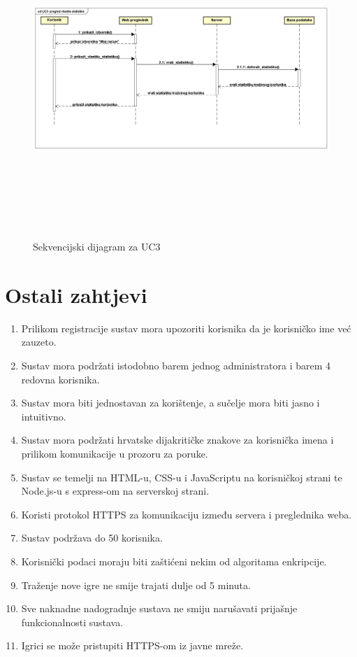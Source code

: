 				\begin{figure}[h]
					\centering
					\includegraphics[width=17cm,height=12cm]{sequenceDiagram2}
					\caption{Sekvencijski dijagram za UC3}
					\label{fig:uc3}
				\end{figure}
				

				\newpage
		\section{Ostali zahtjevi}

			 \begin{enumerate}
			 	\item Prilikom registracije sustav mora upozoriti korisnika da je korisničko ime već zauzeto.
			 	\item Sustav mora podržati istodobno barem jednog administratora i barem 4 redovna korisnika.
			 	\item Sustav mora biti jednostavan za korištenje, a sučelje mora biti jasno i intuitivno.
			 	\item Sustav mora podržati hrvatske dijakritičke znakove za korisnička imena i prilikom komunikacije u prozoru za poruke.
			 	\item Sustav se temelji na HTML-u, CSS-u i JavaScriptu na korisničkoj strani te Node.js-u s express-om na serverskoj strani. 
			 	\item Koristi protokol HTTPS za komunikaciju između servera i preglednika weba.
			 	\item Sustav podržava do 50 korisnika.
			 	\item Korisnički podaci moraju biti zaštićeni nekim od algoritama enkripcije.
			 	\item Traženje nove igre ne smije trajati dulje od 5 minuta.
			 	\item Sve naknadne nadogradnje sustava ne smiju narušavati prijašnje funkcionalnosti sustava.
			 	\item Igrici se može pristupiti HTTPS-om iz javne mreže.
			 \end{enumerate}
			 
			 
	